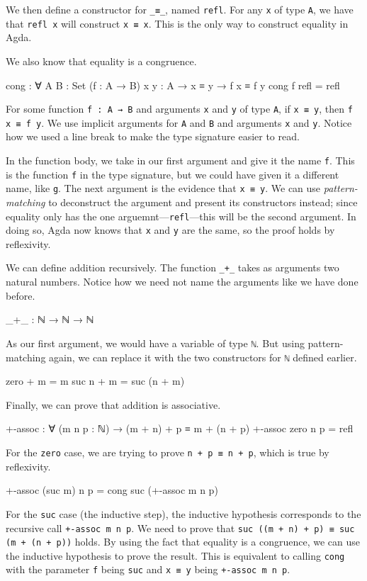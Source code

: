 We then define a constructor for \texttt{\_≡\_}, named \texttt{refl}. For any \texttt{x} of type
\texttt{A}, we have that \texttt{refl x} will construct \texttt{x ≡ x}. This is the only way to
construct equality in Agda.

We also know that equality is a congruence.
\begin{code}
  cong : ∀ {A B : Set} (f : A → B) {x y : A}
    → x ≡ y
    → f x ≡ f y
  cong f refl = refl
\end{code}
For some function \texttt{f : A → B} and arguments \texttt{x} and \texttt{y} of type \texttt{A}, if
\texttt{x ≡ y}, then \texttt{f x ≡ f y}. We use implicit arguments for \texttt{A} and \texttt{B} and
arguments \texttt{x} and \texttt{y}. Notice how we used a line break to make the type signature
easier to read.

In the function body, we take in our first argument and give it the name \texttt{f}. This is the
function \texttt{f} in the type signature, but we could have given it a different name, like
\texttt{g}. The next argument is the evidence that \texttt{x ≡ y}. We can use
\textit{pattern-matching} to deconstruct the argument and present its constructors instead; since
equality only has the one arguemnt---\texttt{refl}---this will be the second argument. In doing so,
Agda now knows that \texttt{x} and \texttt{y} are the same, so the proof holds by reflexivity.

We can define addition recursively. The function \texttt{\_+\_} takes as arguments two natural
numbers. Notice how we need not name the arguments like we have done before.
\begin{code}
  _+_ : ℕ → ℕ → ℕ
\end{code}

As our first argument, we would have a variable of type \texttt{ℕ}. But using pattern-matching
again, we can replace it with the two constructors for \texttt{ℕ} defined earlier.
\begin{code}
  zero  + m = m
  suc n + m = suc (n + m)
\end{code}

Finally, we can prove that addition is associative.
\begin{code}
  +-assoc : ∀ (m n p : ℕ) → (m + n) + p ≡ m + (n + p)
  +-assoc zero    n p = refl
\end{code}
For the \texttt{zero} case, we are trying to prove \texttt{n + p ≡ n + p}, which is true by
reflexivity.
\begin{code}
  +-assoc (suc m) n p = cong suc (+-assoc m n p)
\end{code}
For the \texttt{suc} case (the inductive step), the inductive hypothesis corresponds to the
recursive call \texttt{+-assoc m n p}. We need to prove that \texttt{suc ((m + n) + p) ≡ suc (m + (n
+ p))} holds. By using the fact that equality is a congruence, we can use the inductive hypothesis
to prove the result. This is equivalent to calling \texttt{cong} with the parameter \texttt{f} being
\texttt{suc} and \texttt{x ≡ y} being \texttt{+-assoc m n p}.

